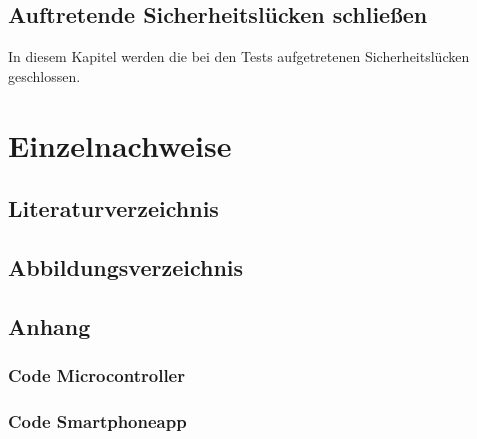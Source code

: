 \documentclass[]{article}
\begin{document}
\subsection{Auftretende Sicherheitslücken schließen}
In diesem Kapitel werden die bei den Tests aufgetretenen Sicherheitslücken geschlossen.
\section{Einzelnachweise}
\subsection{Literaturverzeichnis}
\subsection{Abbildungsverzeichnis}
\listoffigures
\subsection{Anhang}
\subsubsection{Code Microcontroller}
\subsubsection{Code Smartphoneapp}
\end{document}
